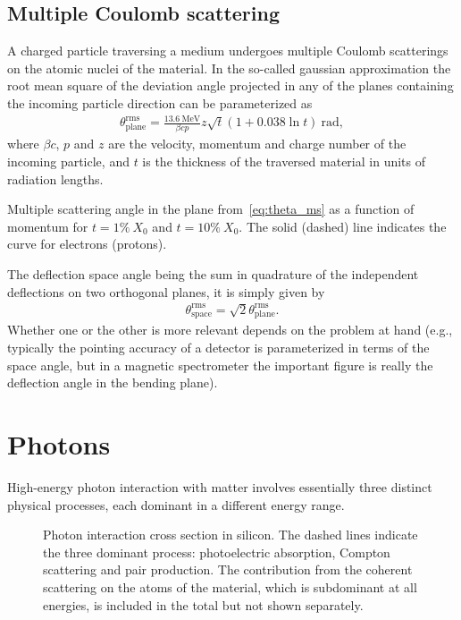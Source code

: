 \subsection{Multiple Coulomb scattering}%
\label{sec:inter_mcs}

A charged particle traversing a medium undergoes multiple Coulomb scatterings
on the atomic nuclei of the material. In the so-called gaussian approximation
the root mean square of the deviation angle projected in any of the planes
containing the incoming particle direction can be parameterized as
\begin{align}\label{eq:theta_ms}
  \theta^\text{rms}_\text{plane} =
  \frac{13.6~\text{MeV}}{\beta c p}z\sqrt{t} (1 + 0.038 \ln t)~\text{rad},
\end{align}
where $\beta c$, $p$ and $z$ are the velocity, momentum and charge number
of the incoming particle, and $t$ is the thickness of the traversed
material in units of radiation lengths.

\begin{marginfigure}
  
  \caption{Multiple scattering angle in the plane from~\eqref{eq:theta_ms} as a
    function of momentum for $t = 1\%~X_0$ and $t = 10\%~X_0$. The solid (dashed)
    line indicates the curve for electrons (protons).}
  \label{fig:multiple_scattering}
\end{marginfigure}

The deflection space angle being the sum in quadrature of the independent
deflections on two orthogonal planes, it is simply given by
\begin{align}
  \theta^\text{rms}_\text{space} = \sqrt{2}\theta^\text{rms}_\text{plane}.
\end{align}
Whether one or the other is more relevant depends on the problem at hand
(e.g., typically the pointing accuracy of a detector is parameterized in terms
of the space angle, but in a magnetic spectrometer the important figure is
really the deflection angle in the bending plane).


\section{Photons}%
\label{sec:inter_gammas}

High-energy photon interaction with matter involves essentially three distinct physical
processes, each dominant in a different energy range.

\begin{figure}[htbp!]
  
  \caption{Photon interaction cross section in silicon. The dashed lines indicate
    the three dominant process: photoelectric absorption, Compton scattering and
    pair production. The contribution from the coherent scattering on the atoms
    of the material, which is subdominant at all energies, is included in the total
    but not shown separately.}
  \label{fig:photon_xsec}
\end{figure}

